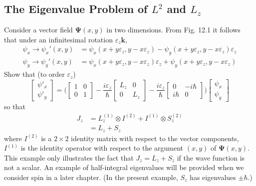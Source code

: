 \documentclass[../principles-of-quantum-mechanics.tex]{subfiles}
\begin{document}
\begin{questions}
	\subsection{The Eigenvalue Problem of $L^2$ and $L_z$}
	\question Consider a vector field $\boldsymbol{\Psi}(x, y)$ in two dimensions. From Fig. 12.1 it follows that under an infinitesimal rotation $\varepsilon_z\mathbf{k}$,
	\begin{align*}
		\psi_x \to \psi_x'(x, y) &= \psi_x(x + y\varepsilon_z, y - x\varepsilon_z) - \psi_y(x + y\varepsilon_z, y - x\varepsilon_z)\varepsilon_z \\
		\psi_y \to \psi_y'(x, y) &= \psi_x(x + y\varepsilon_z, y - x\varepsilon_z)\varepsilon_z + \psi_y(x + y\varepsilon_z, y - x\varepsilon_z)
	\end{align*}
	Show that (to order $\varepsilon_z$)
	$$\begin{bmatrix}
		\psi'_x \\ \psi'_y
		\end{bmatrix}= \Big(\begin{bmatrix}1 & 0 \\ 0 & 1\end{bmatrix} - \frac{i\varepsilon_z}{\hbar}\begin{bmatrix}L_z & 0 \\ 0 & L_z\end{bmatrix} - \frac{i\varepsilon_z}{\hbar}\begin{bmatrix}0 & -i\hbar \\ i\hbar & 0\end{bmatrix}\Big)\begin{bmatrix}\psi_x \\ \psi_y\end{bmatrix}$$
	so that
	\begin{align*}
		J_z &= L_z^{(1)}\otimes I^{(2)} + I^{(1)}\otimes S_z^{(2)} \\
		&= L_z + S_z
	\end{align*}
	where $I^{(2)}$ is a $2\times 2$ identity matrix with respect to the vector components, $I^{(1)}$ is the identity operator with respect to the argument $(x, y)$ of $\boldsymbol{\Psi}(x, y)$. This example only illustrates the fact that $J_z = L_z + S_z$ if the wave function is not a scalar. An example of half-integral eigenvalues will be provided when we consider spin in a later chapter. (In the present example, $S_z$ has eigenvalues $\pm\hbar$.)
	

\end{questions}
\end{document}
